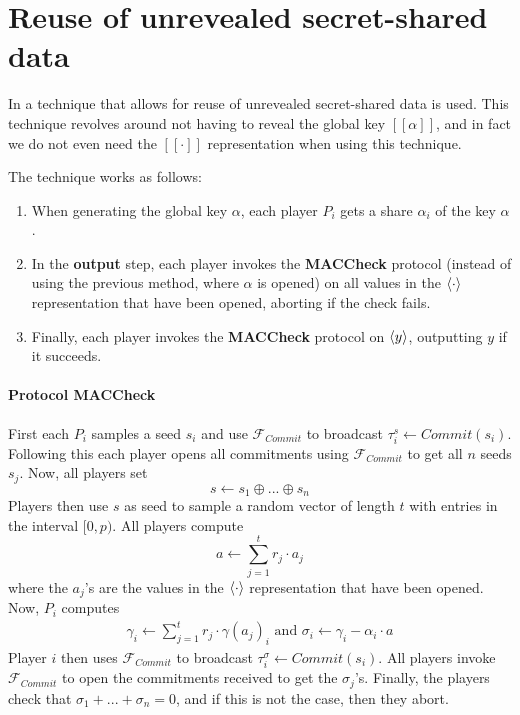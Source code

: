 \documentclass[../main.tex]{subfiles}
\begin{document}
\section{Reuse of unrevealed secret-shared data} \label{section: Reuse}

In \cite{damgaard2013practical} a technique that allows for reuse of unrevealed secret-shared data is used.
This technique revolves around not having to reveal the global key $[\![ \alpha ]\!]$, and in fact we do not even need the $[\![ \cdot ]\!]$ representation when using this technique.

The technique works as follows:
\begin{enumerate}
    \item When generating the global key $\alpha$, each player $P_i$ gets a share $\alpha_i$ of the key $\alpha$.
    \item In the \textbf{output} step, each player invokes the \textbf{MACCheck} protocol (instead of using the previous method, where $\alpha$ is opened) on all values in the $\langle \cdot \rangle$ representation that have been opened, aborting if the check fails.
    \item Finally, each player invokes the \textbf{MACCheck} protocol on $\langle y \rangle$, outputting $y$ if it succeeds.
\end{enumerate}

\paragraph{Protocol MACCheck}
First each $P_i$ samples a seed $s_i$ and use $\mathcal{F}_{Commit}$ to broadcast $\tau^s_i \leftarrow Commit(s_i)$. Following this each player opens all commitments using $\mathcal{F}_{Commit}$ to get all $n$ seeds $s_j$. Now, all players set $$s \leftarrow s_1 \oplus ... \oplus s_n$$
Players then use $s$ as seed to sample a random vector of length $t$ with entries in the interval $[0, p)$.
All players compute $$a \leftarrow \sum^t_{j = 1} r_j \cdot a_j$$ where the $a_j$'s are the values in the $\langle \cdot \rangle$ representation that have been opened.
Now, $P_i$ computes
\begin{align*}
    \gamma_i \leftarrow \sum^t_{j = 1} r_j \cdot \gamma(a_j)_i \text{  and  } \sigma_i \leftarrow \gamma_i - \alpha_i \cdot a
\end{align*}
Player $i$ then uses $\mathcal{F}_{Commit}$ to broadcast $\tau^\sigma_i \leftarrow Commit(s_i)$.
All players invoke $\mathcal{F}_{Commit}$ to open the commitments received to get the $\sigma_j$'s.
Finally, the players check that $\sigma_1 + ... + \sigma_n = 0$, and if this is not the case, then they abort.
\end{document}
